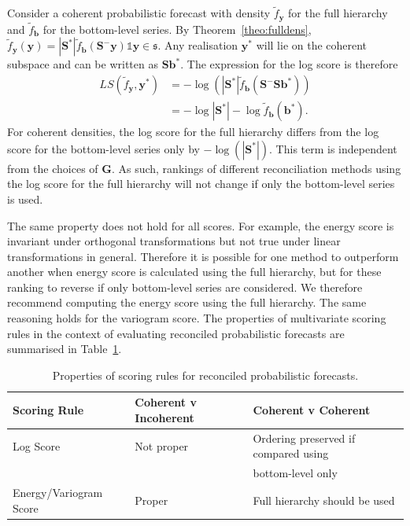 \documentclass[12pt]{article}
\theoremstyle{definition}
\begin{document}
Consider a coherent probabilistic forecast with density $\tilde{f}_{\bm{y}}$ for the full hierarchy and $\tilde{f}_{\bm{b}}$ for the bottom-level series. By Theorem~\ref{theo:fulldens}, $\tilde{f}_{\bm{y}}(\bm{y})=|\bm{S}^*|\tilde{f}_{\bm{b}}(\bm{S}^-\bm{y})\mathbb{1}{\bm{y}\in\mathfrak{s}}$.  Any realisation $\bm{y}^*$ will lie on the coherent subspace and can be written as $\bm{S}\bm{b}^*$.  The expression for the log score is therefore
\begin{align}
LS(\tilde{f}_{\bm y},\bm{y}^*)&=-\log\left(|\bm{S}^*|\tilde{f}_{\bm{b}}(\bm{S}^-\bm{S}\bm{b}^*)\right)\nonumber\\
&=-\log|\bm{S}^*|-\log \tilde{f}_{\bm{b}}(\bm{b}^*).\nonumber
\end{align}
For coherent densities, the log score for the full hierarchy differs from the log score for the bottom-level series only by $-\log(|\bm{S}^*|)$. This term is independent from the choices of ${\bm G}$. As such, rankings of different reconciliation methods using the log score for the full hierarchy will not change if only the bottom-level series is used.

The same property does not hold for all scores. For example, the energy score is invariant under orthogonal transformations \citep{Szekely2013,Gneiting2007} but not true under linear transformations in general. Therefore it is possible for one method to outperform another when energy score is calculated using the full hierarchy, but for these ranking to reverse if only bottom-level series are considered.  We therefore recommend computing the energy score using the full hierarchy.  The same reasoning holds for the variogram score.  The properties of multivariate scoring rules in the context of evaluating reconciled probabilistic forecasts are summarised in Table~\ref{tab:prop}.

\begin{table}
	\caption{Properties of scoring rules for reconciled probabilistic forecasts.}
	\centering
	\begin{tabular}{lll}\hline
		Scoring Rule& Coherent v Incoherent &Coherent v Coherent\\
		\hline
		Log Score & Not proper & Ordering preserved if compared using\\ &&bottom-level only\\
		Energy/Variogram Score & Proper & Full hierarchy should be used\\
		\hline
	\end{tabular}
	
	\label{tab:prop}
\end{table}
\end{document}
